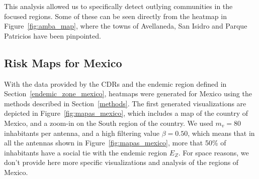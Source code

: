 This analysis allowed us to specifically detect outlying communities in the focused regions. Some of these can be seen directly from the heatmap in Figure~\ref{fig:amba_map}, where the towns of Avellaneda, San Isidro and Parque Patricios have been pinpointed.




\subsection{Risk Maps for Mexico}

With the data provided by the CDRs and the endemic region defined in Section~\ref{endemic_zone_mexico}, heatmaps were generated for Mexico using the methods described in Section~\ref{methods}. The first generated visualizations are depicted in Figure~\ref{fig:mapas_mexico},
which includes a map of the country of Mexico, and a zoom-in on the South region of the country.
We used $m_v = 80$ inhabitants per antenna, and a high filtering value $\beta = 0.50$, which 
means that in all the antennas shown in Figure~\ref{fig:mapas_mexico},
more that 50\% of inhabitants have a social tie with the endemic region $E_Z$.
For space reasons, we don't provide here more specific visualizations and analysis of the regions of Mexico.

